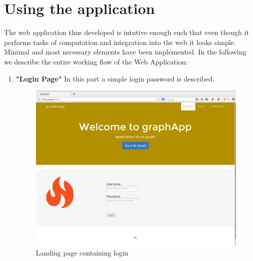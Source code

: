 \section{Using the application}
The web application thus developed is intutive enough such that even though it performs tasks of computation and integration into the web it looks simple. Minimal and most necessary elements have been implemented.
In the following we describe the entire working flow of the Web Application:
\begin{enumerate}
\item \textbf{"Login Page"} In this part a simple login password is described.  
\begin{figure}[H]
\centering
\includegraphics[scale=0.3]{s1.png}
\caption{Landing page containing login}
\end{figure}


\end{enumerate}
